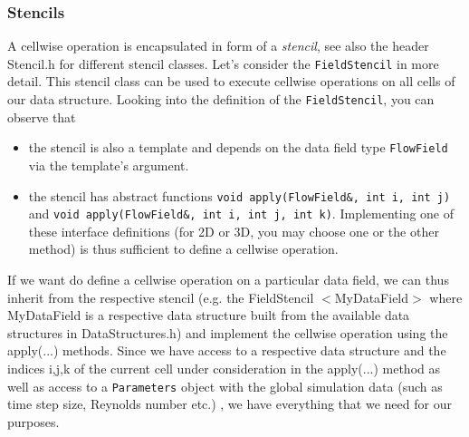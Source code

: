 \documentclass[pdftex,A4]{article}
\begin{document}
\subsubsection{Stencils}\label{sec:stencils}
A cellwise operation is encapsulated in form of a {\it stencil}, see also the header Stencil.h for different stencil classes.
Let's consider the {\tt FieldStencil} in more detail.
This stencil class can be used to execute cellwise operations on all cells of our data structure.
Looking into the definition of the {\tt FieldStencil}, you can observe that
  \begin{itemize}
  \item the stencil is also a template and depends on the data field type {\tt FlowField} via the template's argument.
  \item the stencil has abstract functions {\tt void apply(FlowField\&, int i, int j)} and {\tt void apply(FlowField\&, int i, int j, int k)}. Implementing one of these interface definitions (for 2D or 3D, you may choose one or the other method) is thus sufficient to define a cellwise operation.
  \end{itemize}
If we want do define a cellwise operation on a particular data field, we can thus inherit from the respective stencil (e.g. the FieldStencil $<$MyDataField$>$ where MyDataField is a respective data structure built from the available data structures in DataStructures.h) and implement the cellwise operation using the apply(...) methods.
Since we have access to a respective data structure and the indices i,j,k of the current cell under consideration in the apply(...) method as well as access to a {\tt Parameters} object with the global simulation data (such as time step size, Reynolds number etc.) , we have everything that we need for our purposes.
\end{document}
